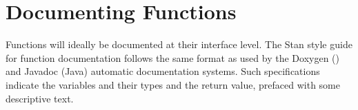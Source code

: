 




\section{Documenting Functions}\label{documenting-functions.section}

Functions will ideally be documented at their interface level.  The
Stan style guide for function documentation follows the same format as
used by the Doxygen (\Cpp) and Javadoc (Java) automatic documentation
systems.  Such specifications indicate the variables and their types
and the return value, prefaced with some descriptive text.

